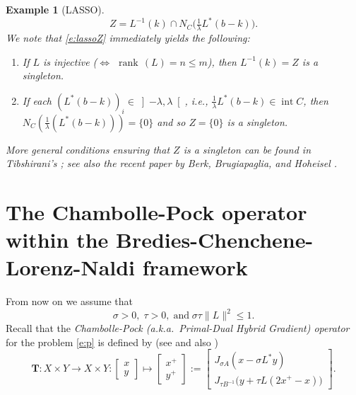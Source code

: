 \documentclass{article}
\providecommand{\siff}{\Leftrightarrow}
\newcommand{\inte}{\ensuremath{\operatorname{int}}}
\newcommand{\rnk}{\ensuremath{{\operatorname{rank}}\,}}
\newcommand{\bT}{\ensuremath{{\mathbf{T}}}}
\newtheorem{example}[theorem]{Example}
\begin{document}
\begin{example}[LASSO]
\begin{equation}
\label{e:lassoZ}
Z = L^{-1}(k) \cap N_C\big(\tfrac{1}{\lambda}L^*(b-k)\big). 
\end{equation}
We note that \cref{e:lassoZ} immediately yields the following:
\begin{enumerate}
\item If $L$ is injective ($\siff$ $\rnk(L)=n\leq m$), 
then $L^{-1}(k) = Z$ is a singleton.
\item If each $(L^*(b-k))_i \in \left]-\lambda,\lambda\right[$, i.e., 
$\tfrac{1}{\lambda}L^*(b-k)\in\inte C$, then $N_C(\tfrac{1}{\lambda}(L^*(b-k)))=\{0\}$ and so $Z=\{0\}$ is a singleton. 
\end{enumerate}
More general conditions ensuring that $Z$ is a singleton can be found in 
Tibshirani's \cite{Tibuni}; see also 
the recent paper by 
Berk, Brugiapaglia, and Hoheisel \cite{BBH}. 
\end{example}



\section{The Chambolle-Pock operator within the Bredies-Chenchene-Lorenz-Naldi framework}

\label{s:CP}

From now on we assume that 
\begin{equation}
\sigma>0,
\;
\tau > 0,
\; \text{and}\; 
\sigma\tau\|L\|^2 \leq 1.
\end{equation}
Recall that the \emph{Chambolle-Pock (a.k.a.\ Primal-Dual Hybrid Gradient) operator} for the problem \cref{e:p} is
defined by (see \cite{CP} and also \cite{CPsurvey})
\begin{equation} \label{e:T}
\bT \colon X\times Y \to X\times Y\colon 
\begin{bmatrix}x\\y\end{bmatrix} \mapsto 
  \begin{bmatrix}
  x^+\\y^+
  \end{bmatrix}
  :=\begin{bmatrix}
  J_{\sigma A}(x-\sigma L^*y)\\
  J_{\tau B^{-1}}\big({y+\tau L(2x^+-x)}\big)
  \end{bmatrix}. 
\end{equation}
\end{document}
